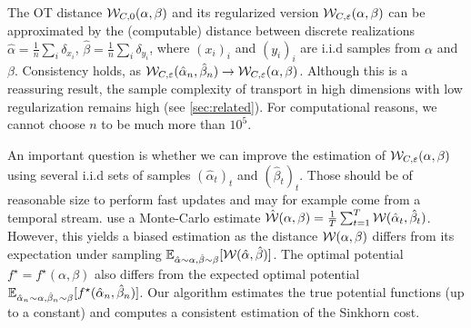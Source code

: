 The OT distance $\mathcal{W}_{C,0}(\alpha,\beta)$ and its regularized version
$\mathcal{W}_{C,\varepsilon}(\alpha,\beta)$ can be approximated by the (computable)
distance between discrete realizations $\hat \alpha = \frac{1}{n} \sum_i
\delta_{x_i}$, $\hat \beta = \frac{1}{n} \sum_i \delta_{y_i}$, where ${(x_i)}_i$
and ${(y_i)}_i$ are i.i.d samples from $\alpha$ and $\beta$.  Consistency holds,
as $\mathcal{W}_{C,\varepsilon}(\hat \alpha_n, \hat \beta_n) \to \mathcal{W}_{C,\varepsilon}(\alpha,
\beta)$. Although this is a reassuring result, the sample complexity of
transport in high dimensions with low regularization remains high (see
\autoref{sec:related}). For computational reasons, we cannot choose $n$ to be
much more than $10^5$. 


An important question is whether we can improve the estimation of
$\mathcal{W}_{C,\varepsilon}(\alpha,\beta)$ using several i.i.d sets of samples $(\hat
\alpha_t)_t$ and ${(\hat \beta_t)}_t$. Those should be of reasonable size to
perform fast updates and may for example come from a temporal stream.
\citet{2018-Genevay-aistats} use a Monte-Carlo estimate $\hat {\mathcal{W}}(\alpha, \beta)
= \frac{1}{T} \sum_{t=1}^T \mathcal{W}(\hat \alpha_t, \hat \beta_t)$. However, this
yields a biased estimation as the distance $\mathcal{W}(\alpha, \beta)$ differs from its
expectation under sampling $\mathbb{E}_{\hat \alpha \sim \alpha, \hat \beta \sim \beta}
[\mathcal{W}(\hat \alpha, \hat \beta)]$. The optimal potential
$f^\star=f^\star(\alpha, \beta)$ also differs from the expected optimal
potential $\mathbb{E}_{\hat \alpha_n \sim \alpha, \hat \beta_n \sim \beta}[f^\star(\hat
\alpha_n, \hat \beta_n)]$. Our algorithm estimates the true
potential functions (up to a constant) and computes a consistent estimation of
the Sinkhorn cost.